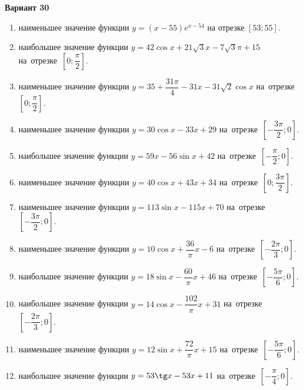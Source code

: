 \documentclass[a4paper,10pt]{article}
\begin{document}
\begin{center}\Large\textbf{Вариант 30}\end{center}

\begin{enumerate}
\item {} наименьшее значение функции $y = \left(x-55\right)e^{x-54}$ на отрезке $\left[53;55\right]$.

\item {} наибольшее значение функции $y = 42\cos x+21\sqrt{3}x-7\sqrt{3}\pi +15$ на~отрезке~$\left[0;\dfrac{\pi }{2}\right]$.

\item {} наименьшее значение функции $y = 35+\dfrac{31 \pi}{4}-31x-31\sqrt{2}\cos x$ на~отрезке~$\left[0;\dfrac{\pi }{2}\right]$.

\item {} наименьшее значение функции $y = 30\cos x-33x+29$ на~отрезке~$\left[-\dfrac{3\pi }{2};0\right]$.

\item {} наибольшее значение функции $y = 59x-56\sin x+42$ на~отрезке~$\left[-\dfrac{\pi }{2};0\right]$.

\item {} наименьшее значение функции $y = 40\cos x+43x+34$ на~отрезке~$\left[0;\dfrac{3\pi }{2}\right]$.

\item {} наименьшее значение функции $y = 113\sin x-115x+70$ на~отрезке~$\left[-\dfrac{3\pi }{2};0\right]$.

\item {} наименьшее значение функции $y = 10\cos x+\dfrac{36}{\pi }x -6$ на~отрезке~$\left[-\dfrac{2\pi }{3};0\right]$.

\item {} наибольшее значение функции $y = 18\sin x-\dfrac{60}{\pi }x+46$ на~отрезке~$\left[-\dfrac{5\pi }{6};0\right]$.

\item {} наибольшее значение функции $y = 14\cos x-\dfrac{102}{\pi }x+31$ на~отрезке~$\left[-\dfrac{2\pi }{3};0\right]$.

\item {} наименьшее значение функции $y = 12\sin x+\dfrac{72}{\pi }x+15$ на~отрезке~$\left[-\dfrac{5\pi }{6};0\right]$.

\item {} наибольшее значение функции $y = 53\tg x-53x+11$ на~отрезке~$\left[-\dfrac{\pi }{4};0\right]$.


\end{enumerate}
\end{document}
